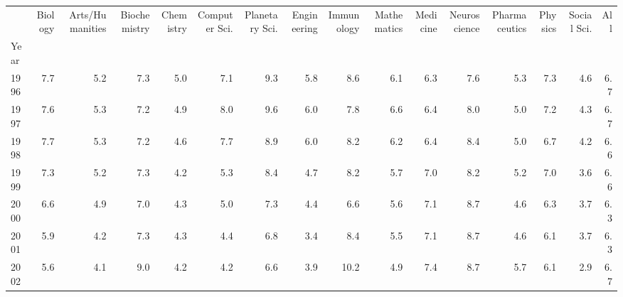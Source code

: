 \begin{tabular}{lrrrrrrrrrrrrrrr}
\toprule
{} &  Biology &  Arts/Humanities &  Biochemistry &  Chemistry &  Computer Sci. &  Planetary Sci. &  Engineering &  Immunology &  Mathematics &  Medicine &  Neuroscience &  Pharmaceutics &  Physics &  Social Sci. &   All \\
Year                    &          &                  &               &            &                &                 &              &             &              &           &               &                &          &              &       \\
\midrule
1996                    &      7.7 &              5.2 &           7.3 &        5.0 &            7.1 &             9.3 &          5.8 &         8.6 &          6.1 &       6.3 &           7.6 &            5.3 &      7.3 &          4.6 &   6.7 \\
1997                    &      7.6 &              5.3 &           7.2 &        4.9 &            8.0 &             9.6 &          6.0 &         7.8 &          6.6 &       6.4 &           8.0 &            5.0 &      7.2 &          4.3 &   6.7 \\
1998                    &      7.7 &              5.3 &           7.2 &        4.6 &            7.7 &             8.9 &          6.0 &         8.2 &          6.2 &       6.4 &           8.4 &            5.0 &      6.7 &          4.2 &   6.6 \\
1999                    &      7.3 &              5.2 &           7.3 &        4.2 &            5.3 &             8.4 &          4.7 &         8.2 &          5.7 &       7.0 &           8.2 &            5.2 &      7.0 &          3.6 &   6.6 \\
2000                    &      6.6 &              4.9 &           7.0 &        4.3 &            5.0 &             7.3 &          4.4 &         6.6 &          5.6 &       7.1 &           8.7 &            4.6 &      6.3 &          3.7 &   6.3 \\
2001                    &      5.9 &              4.2 &           7.3 &        4.3 &            4.4 &             6.8 &          3.4 &         8.4 &          5.5 &       7.1 &           8.7 &            4.6 &      6.1 &          3.7 &   6.3 \\
2002                    &      5.6 &              4.1 &           9.0 &        4.2 &            4.2 &             6.6 &          3.9 &        10.2 &          4.9 &       7.4 &           8.7 &            5.7 &      6.1 &          2.9 &   6.7 \\

\end{tabular}
